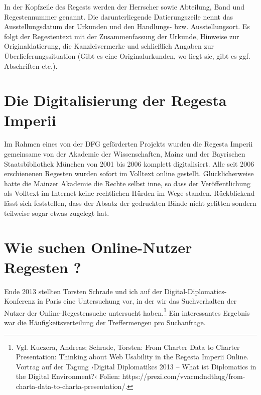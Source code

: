 \documentclass[ngerman,]{scrreprt}
\begin{document}
In der Kopfzeile des Regests werden der Herrscher sowie Abteilung, Band und Regestennummer genannt. Die darunterliegende Datierungszeile nennt das Ausstellungsdatum der Urkunden und den Handlungs- bzw. Ausstellungsort. Es folgt der Regestentext mit der Zusammenfassung der Urkunde, Hinweise zur Originaldatierung, die Kanzleivermerke und schließlich Angaben zur Überlieferungssituation (Gibt es eine Originalurkunden, wo liegt sie, gibt es ggf. Abschriften etc.).

\section{Die Digitalisierung der Regesta Imperii}\label{die-digitalisierung-der-regesta-imperii}

Im Rahmen eines von der DFG geförderten Projekts wurden die Regesta Imperii gemeinsame von der Akademie der Wissenschaften, Mainz und der Bayrischen Staatsbibliothek München von 2001 bis 2006 komplett digitalisiert. Alle seit 2006 erschienenen Regesten wurden sofort im Volltext online gestellt. Glücklicherweise hatte die Mainzer Akademie die Rechte selbst inne, so dass der Veröffentlichung als Volltext im Internet keine rechtlichen Hürden im Wege standen. Rückblickend lässt sich feststellen, dass der Absatz der gedruckten Bände nicht gelitten sondern teilweise sogar etwas zugelegt hat.

\section{Wie suchen Online-Nutzer Regesten ?}\label{wie-suchen-online-nutzer-regesten}

Ende 2013 stellten Torsten Schrade und ich auf der Digital-Diplomatics-Konferenz in Paris eine Untersuchung vor, in der wir das Suchverhalten der Nutzer der Online-Regestensuche untersucht haben.\footnote{Vgl. Kuczera, Andreas; Schrade, Torsten: From Charter Data to Charter Presentation: Thinking about Web Usability in the Regesta Imperii Online. Vortrag auf der Tagung ›Digital Diplomatikcs 2013 -- What ist Diplomatics in the Digital Environment?‹ Folien: https://prezi.com/vvacmdndthqg/from-charta-data-to-charta-presentation/.} Ein interessantes Ergebnis war die Häufigkeitsverteilung der Treffermengen pro Suchanfrage.
\end{document}
